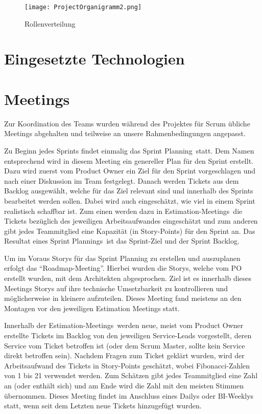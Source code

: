     \begin{figure}[!hbt]
        \texttt{[image: ProjectOrganigramm2.png]}
        \caption{Rollenverteilung}
        \label{fig:Rollenverteilung}
    \end{figure}
    
\section{Eingesetzte Technologien}

\section{Meetings}
    Zur Koordination des Teams wurden während des Projektes für Scrum übliche Meetings abgehalten und teilweise an unsere Rahmenbedingungen angepasst.

    Zu Beginn jedes Sprints findet einmalig das \glqq Sprint Planning\grqq~statt. Dem Namen entsprechend wird in diesem Meeting ein genereller Plan 
    für den Sprint erstellt. Dazu wird zuerst vom Product Owner ein Ziel für den Sprint vorgeschlagen und nach einer Diskussion im Team festgelegt.
    Danach werden Tickets aus dem Backlog ausgewählt, welche für das Ziel relevant sind und innerhalb des Sprints bearbeitet werden sollen. Dabei 
    wird auch eingeschätzt, wie viel in einem Sprint realistisch schaffbar ist. Zum einen werden dazu in \glqq Estimation-Meetings\grqq~die Tickets
    bezüglich des jeweiligen Arbeitsaufwandes eingeschätzt und zum anderen gibt jedes Teammitglied eine Kapazität (in Story-Points) für den Sprint an.
    Das Resultat eines \glqq Sprint Plannings\grqq~ist das Sprint-Ziel und der Sprint Backlog.

    Um im Voraus Storys für das Sprint Planning zu erstellen und auszuplanen erfolgt das \enquote{Roadmap-Meeting}.
    Hierbei wurden die Storys, welche vom PO erstellt wurden, mit dem Architekten abgesprochen.
    Ziel ist es innerhalb dieses Meetings Storys auf ihre technische Umsetzbarkeit zu kontrollieren und möglicherweise in kleinere aufzuteilen.
    Dieses Meeting fand meistens an den Montagen vor den jeweiligen Estimation Meetings statt.

    Innerhalb der \glqq Estimation-Meetings\grqq~werden neue, meist vom Product Owner erstellte Tickets im Backlog von den jeweiligen Service-Leads
    vorgestellt, deren Service vom Ticket betroffen ist (oder dem Scrum Master, sollte kein Service direkt betroffen sein). Nachdem Fragen zum Ticket
    geklärt wurden, wird der Arbeitsaufwand des Tickets in Story-Points geschätzt, wobei Fibonacci-Zahlen von 1 bis 21 verwendet werden. Zum Schätzen
    gibt jedes Teammitglied eine Zahl an (oder enthält sich) und am Ende wird die Zahl mit den meisten Stimmen übernommen. 
    Dieses Meeting findet im Anschluss eines Dailys oder BI-Weeklys statt, wenn seit dem Letzten neue Tickets hinzugefügt wurden.


